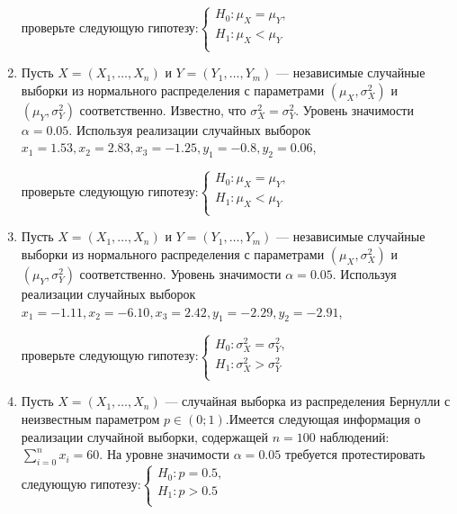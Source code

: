 \begin{enumerate}
проверьте следующую гипотезу:$\begin{cases}
H_{0}:\mu_{X} = \mu_{Y}, \\
H_{1}:\mu_{X} < \mu_{Y} \\
\end{cases}$

\item Пусть $X = (X_{1}, \ldots, X_{n})$ и $Y = (Y_{1}, \ldots, Y_{m})$ — независимые случайные
выборки из нормального распределения с параметрами $(\mu_{X},\sigma^2_{X})$ и $(\mu_{Y},\sigma^2_{Y})$ соответственно. Известно, что $\sigma^2_{X} = \sigma^2_{Y}$. Уровень значимости $\alpha = 0.05$. Используя реализации случайных выборок\newline
\hspace*{3cm}$x_{1} = 1.53, x_{2} = 2.83, x_{3} = -1.25, y_{1} = -0.8, y_{2} = 0.06$,

проверьте следующую гипотезу:$\begin{cases}
H_{0}:\mu_{X} = \mu_{Y}, \\
H_{1}:\mu_{X} < \mu_{Y} \\
\end{cases}$


\item Пусть $X = (X_{1}, \ldots, X_{n})$ и $Y = (Y_{1}, \ldots, Y_{m})$ — независимые случайные
выборки из нормального распределения с параметрами $(\mu_{X},\sigma^2_{X})$ и $(\mu_{Y},\sigma^2_{Y})$ соответственно.
Уровень значимости $\alpha = 0.05$. Используя реализации случайных выборок\newline
\hspace*{3cm}$x_{1} = -1.11, x_{2} = -6.10, x_{3} = 2.42, y_{1} = -2.29, y_{2} = -2.91$,

проверьте следующую гипотезу:$\begin{cases}
H_{0}:\sigma^2_{X} = \sigma^2_{Y}, \\
H_{1}:\sigma^2_{X} > \sigma^2_{Y} \\
\end{cases}$

\item Пусть  $X = (X_{1}, \ldots, X_{n})$ — случайная выборка из распределения Бернулли с
неизвестным параметром $p \in (0;1)$.Имеется следующая информация о реализации
случайной выборки, содержащей $n = 100$ наблюдений: $\sum_{i=0}^{n} x_{i} = 60$.
На уровне значимости $\alpha = 0.05$ требуется протестировать следующую гипотезу:$\begin{cases}
H_{0}:p = 0.5, \\
H_{1}:p > 0.5 \\
\end{cases}$


\end{enumerate}
